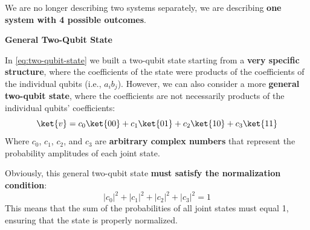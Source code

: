 \highspace
We are no longer describing two systems separately, we are describing \textbf{one system with 4 possible outcomes}.

\highspace
\begin{flushleft}
    \textcolor{Green3}{ \textbf{General Two-Qubit State}}
\end{flushleft}
In \autoref{eq:two-qubit-state} we built a two-qubit state starting from a \textbf{very specific structure}, where the coefficients of the state were products of the coefficients of the individual qubits (i.e., $a_{i}b_{j}$). However, we can also consider a more \textbf{general two-qubit state}, where the coefficients are not necessarily products of the individual qubits' coefficients:
\begin{equation}\label{eq:general-two-qubit-state}
    \ket{v} = c_{0}\ket{00} + c_{1}\ket{01} + c_{2}\ket{10} + c_{3}\ket{11}
\end{equation}
Where $c_{0}$, $c_{1}$, $c_{2}$, and $c_{3}$ are \textbf{arbitrary complex numbers} that represent the probability amplitudes of each joint state.

\highspace
Obviously, this general two-qubit state \textbf{must satisfy the normalization condition}:
\begin{equation}
    \left|c_{0}\right|^{2} + \left|c_{1}\right|^{2} + \left|c_{2}\right|^{2} + \left|c_{3}\right|^{2} = 1
\end{equation}
This means that the sum of the probabilities of all joint states must equal 1, ensuring that the state is properly normalized.

